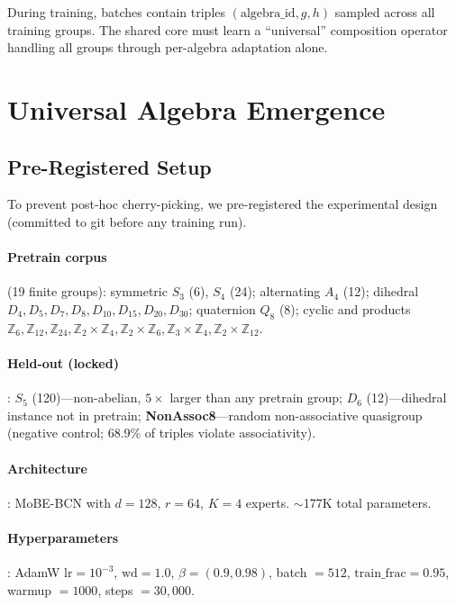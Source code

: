 \documentclass[11pt]{article}
\begin{document}
During training, batches contain triples $(\text{algebra\_id}, g, h)$
sampled across all training groups. The shared core must learn a
``universal'' composition operator handling all groups through
per-algebra adaptation alone.

\section{Universal Algebra Emergence}
\label{sec:universal}

\subsection{Pre-Registered Setup}

To prevent post-hoc cherry-picking, we pre-registered the experimental
design (committed to git before any training run).

\paragraph{Pretrain corpus} (19 finite groups):
symmetric $S_3$ (6), $S_4$ (24); alternating $A_4$ (12);
dihedral $D_4, D_5, D_7, D_8, D_{10}, D_{15}, D_{20}, D_{30}$;
quaternion $Q_8$ (8); cyclic and products
$\mathbb{Z}_6, \mathbb{Z}_{12}, \mathbb{Z}_{24},
\mathbb{Z}_2 \times \mathbb{Z}_4,
\mathbb{Z}_2 \times \mathbb{Z}_6,
\mathbb{Z}_3 \times \mathbb{Z}_4,
\mathbb{Z}_2 \times \mathbb{Z}_{12}$.

\paragraph{Held-out (locked)}: $S_5$ (120)---non-abelian, $5\times$
larger than any pretrain group; $D_6$ (12)---dihedral instance not in
pretrain; \textbf{NonAssoc8}---random non-associative quasigroup
(negative control; 68.9\% of triples violate associativity).

\paragraph{Architecture}: MoBE-BCN with $d = 128$, $r = 64$, $K = 4$
experts. $\sim$177K total parameters.

\paragraph{Hyperparameters}: AdamW $\text{lr} = 10^{-3}$, $\text{wd} = 1.0$,
$\beta = (0.9, 0.98)$, batch $= 512$, $\text{train\_frac} = 0.95$,
warmup $= 1000$, steps $= 30{,}000$.
\end{document}
